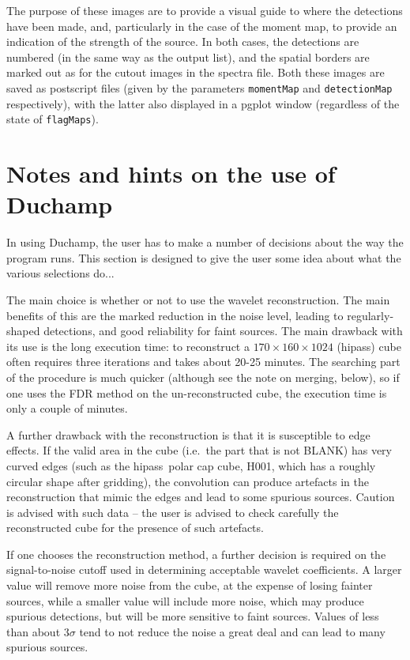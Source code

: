 \documentclass[12pt]{article}
\newcommand{\ie}{i.e.\ }
\newcommand{\hipass}{{\sc hipass}}
\begin{document}
The purpose of these images are to provide a visual guide to where the
detections have been made, and, particularly in the case of the moment
map, to provide an indication of the strength of the source. In both
cases, the detections are numbered (in the same way as the output
list), and the spatial borders are marked out as for the cutout images
in the spectra file. Both these images are saved as postscript files
(given by the parameters {\tt momentMap} and {\tt detectionMap}
respectively), with the latter also displayed in a {\sc pgplot}
window (regardless of the state of {\tt flagMaps}).

\section{Notes and hints on the use of Duchamp}

In using Duchamp, the user has to make a number of decisions about
the way the program runs. This section is designed to give the user
some idea about what the various selections do...

The main choice is whether or not to use the wavelet
reconstruction. The main benefits of this are the marked reduction in
the noise level, leading to regularly-shaped detections, and good
reliability for faint sources. The main drawback with its use is the
long execution time: to reconstruct a $170\times160\times1024$
(\hipass) cube often requires three iterations and takes about 20-25
minutes. The searching part of the procedure is much quicker (although
see the note on merging, below), so if one uses the FDR method on the
un-reconstructed cube, the execution time is only a couple of minutes.

A further drawback with the reconstruction is that it is susceptible
to edge effects. If the valid area in the cube (\ie the part that is
not BLANK) has very curved edges (such as the \hipass\ polar cap cube,
H001, which has a roughly circular shape after gridding), the
convolution can produce artefacts in the reconstruction that mimic
the edges and lead to some spurious sources. Caution is advised with
such data -- the user is advised to check carefully the reconstructed
cube for the presence of such artefacts.

If one chooses the reconstruction method, a further decision is
required on the signal-to-noise cutoff used in determining acceptable
wavelet coefficients. A larger value will remove more noise from the
cube, at the expense of losing fainter sources, while a smaller value
will include more noise, which may produce spurious detections, but
will be more sensitive to faint sources. Values of less than about
$3\sigma$ tend to not reduce the noise a great deal and can lead to
many spurious sources.
\end{document}

